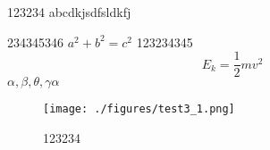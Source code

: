 
123234 abcdkjsdfsldkfj 

234345346 $a^2 + b^2 = c^2$ 123234345
$$
E_k = \frac{1}{2}mv^2
$$
$\alpha, \beta, \theta, \gamma \alpha$

\begin{figure}[ht]
\centering
\texttt{[image: ./figures/test3\_1.png]}
\caption{123234} \label{test3_fig1}
\end{figure}